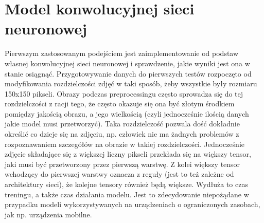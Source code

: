 \section{Model konwolucyjnej sieci neuronowej}
Pierwszym zastosowanym podejściem jest zaimplementowanie od podstaw własnej konwolucyjnej sieci neuronowej i sprawdzenie, jakie wyniki jest ona w stanie osiągnąć. Przygotowywanie danych do pierwszych testów rozpoczęto od modyfikowania rozdzielczości zdjęć w taki sposób, żeby wszystkie były rozmiaru 150x150 pikseli. Obrazy podczas preprocessingu często sprowadza się do tej rozdzielczości z racji tego, że często okazuje się ona być złotym środkiem pomiędzy jakością obrazu, a jego wielkością (czyli jednocześnie ilością danych jakie model musi przetworzyć). Taka rozdzielczość pozwala dość dokładnie określić co dzieje się na zdjęciu, np. człowiek nie ma żadnych problemów z rozpoznawaniem szczegółów na obrazie w takiej rozdzielczości. Jednocześnie zdjęcie składające się z większej liczny pikseli przekłada się na większy tensor, jaki musi być przetworzony przez pierwszą warstwę. Z kolei większy tensor wchodzący do pierwszej warstwy oznacza z reguły (jest to też zależne od architektury sieci), że kolejne tensory również będą większe.
Wydłuża to czas treningu, a także czas działania modelu. Jest to zdecydowanie niepożądane w przypadku modeli wykorzystywanych na urządzeniach 
o ograniczonych zasobach,  jak np. urządzenia mobilne.

